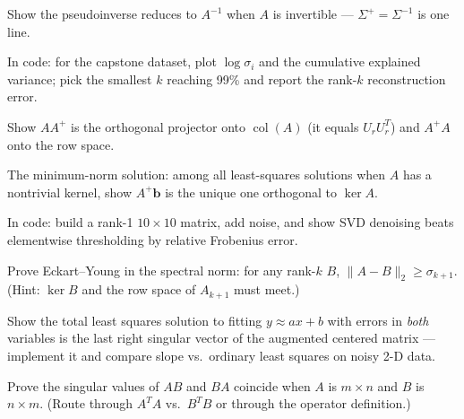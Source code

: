 \begin{exercise}[medium]
Show the pseudoinverse reduces to $A^{-1}$ when $A$ is invertible ---
$\Sigma^{+}=\Sigma^{-1}$ is one line.
\end{exercise}

\begin{exercise}[medium]
In code: for the capstone dataset, plot $\log\sigma_i$ and the cumulative
explained variance; pick the smallest $k$ reaching 99\% and report the
rank-$k$ reconstruction error.
\end{exercise}

\begin{exercise}[medium]
Show $AA^{+}$ is the orthogonal projector onto $\operatorname{col}(A)$
(it equals $U_rU_r^{T}$) and $A^{+}A$ onto the row space.
\end{exercise}

\begin{exercise}[medium]
The minimum-norm solution: among all least-squares solutions when $A$
has a nontrivial kernel, show $A^{+}\mathbf b$ is the unique one
orthogonal to $\ker A$.
\end{exercise}

\begin{exercise}[medium]
In code: build a rank-1 $10\times10$ matrix, add noise, and show SVD
denoising beats elementwise thresholding by relative Frobenius error.
\end{exercise}

\begin{exercise}[hard]
Prove Eckart--Young in the spectral norm: for any rank-$k$ $B$,
$\lVert A-B\rVert_2\ge\sigma_{k+1}$. (Hint: $\ker B$ and the row space
of $A_{k+1}$ must meet.)
\end{exercise}

\begin{exercise}[hard]
Show the total least squares solution to fitting $y\approx a x+b$ with
errors in \emph{both} variables is the last right singular vector of the
augmented centered matrix --- implement it and compare slope vs.\ ordinary
least squares on noisy 2-D data.
\end{exercise}

\begin{exercise}[hard]
Prove the singular values of $AB$ and $BA$ coincide when $A$ is $m\times n$
and $B$ is $n\times m$. (Route through $A^{T}A$ vs.\ $B^{T}B$ or through
the operator definition.)
\end{exercise}

